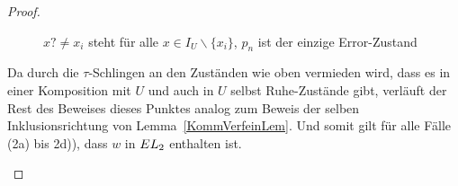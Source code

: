 \begin{proof}
\begin{itemize}
\begin{figure} [h!tbp]
\begin{center}
        \caption{$x?\neq x_i$ steht für alle $x\in I_U\backslash\{x_i\}$, $p_n$
          ist der einzige Error-Zustand}
      \label{UmitEundTau}
      \end{center}
      \end{figure}
      Da durch die $\tau$-Schlingen an den Zuständen wie oben vermieden wird,
      dass es in einer Komposition mit $U$ und auch in $U$ selbst Ruhe-Zustände
      gibt, verläuft der Rest des Beweises dieses Punktes analog zum Beweis der
      selben Inklusionsrichtung von Lemma~\ref{KommVerfeinLem}. Und somit gilt
      für alle Fälle (2a) bis 2d)), dass $w$ in $EL _2$ enthalten ist.
  \end{itemize}


\end{proof}
